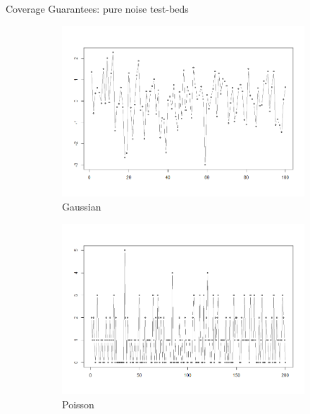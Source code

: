 \documentclass{beamer}
\begin{document}
\begin{frame}{Coverage Guarantees: pure noise test-beds}

\begin{figure}
\centering
\begin{subfigure}[b]{0.3\textwidth}
    \centering
    \includegraphics[width=\textwidth]{../plots/plain-gauss}
    \caption{Gaussian}
\end{subfigure}
\begin{subfigure}[b]{0.3\textwidth}
    \centering
    \includegraphics[width=\textwidth]{../plots/plain-poisson}
    \caption{Poisson}
\end{subfigure}
\begin{subfigure}[b]{0.3\textwidth}
    \centering

\end{subfigure}
\end{figure}
\end{frame}
\end{document}

